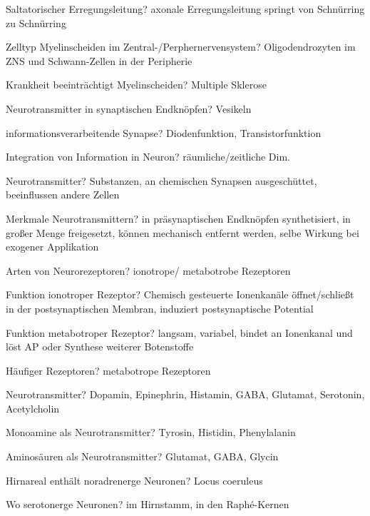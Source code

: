\documentclass[a4paper]{article}
\begin{document}
\begin{multicols}{3}
  Saltatorischer Erregungsleitung? axonale Erregungsleitung springt von Schnürring zu Schnürring

  Zelltyp Myelinscheiden im Zentral-/Perphernervensystem? Oligodendrozyten im ZNS und Schwann-Zellen in der Peripherie

  Krankheit beeinträchtigt Myelinscheiden? Multiple Sklerose

  Neurotransmitter in synaptischen Endknöpfen? Vesikeln

  informationsverarbeitende Synapse? Diodenfunktion, Transistorfunktion

  Integration von Information in Neuron? räumliche/zeitliche Dim.

  Neurotransmitter? Substanzen, an chemischen Synapsen ausgeschüttet, beeinflussen andere Zellen %

  Merkmale Neurotransmittern? in präsynaptischen Endknöpfen synthetisiert, in großer Menge freigesetzt, können mechanisch entfernt werden, selbe Wirkung bei exogener Applikation

  Arten von Neurorezeptoren? ionotrope/ metabotrobe Rezeptoren

  Funktion ionotroper Rezeptor? Chemisch gesteuerte Ionenkanäle öffnet/schließt in der postsynaptischen Membran, induziert postsynaptische Potential

  Funktion metabotroper Rezeptor? langsam, variabel, bindet an Ionenkanal und löst AP oder Synthese weiterer Botenstoffe

  Häufiger Rezeptoren? metabotrope Rezeptoren

  Neurotransmitter? Dopamin, Epinephrin, Histamin, GABA, Glutamat, Serotonin, Acetylcholin

  Monoamine als Neurotransmitter? Tyrosin, Histidin, Phenylalanin

  Aminosäuren als Neurotransmitter? Glutamat, GABA, Glycin




  Hirnareal enthält noradrenerge Neuronen? Locus coeruleus

  Wo serotonerge Neuronen? im Hirnstamm, in den Raphé-Kernen



\end{multicols}
\end{document}
